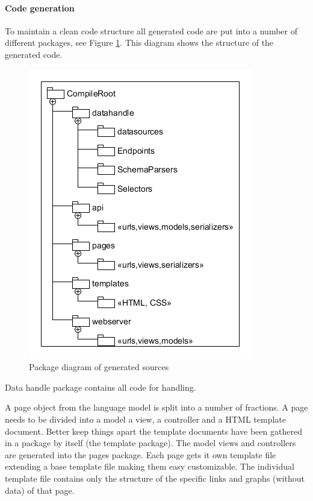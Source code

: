 \paragraph{Code generation}
To maintain a clean code structure all generated code are put into a number of different packages, see Figure \ref{fig:packagediagram}.
This diagram shows the structure of the generated code.
\begin{figure}
\begin{center}
\includegraphics[width=\linewidth]{images/PackageDiagram}
\end{center}
\caption{Package diagram of generated sources}
\label{fig:packagediagram}
\end{figure}
Data handle package contains all code for handling.

A page object from the language model is split into a number of fractions.
A page needs to be divided into a model a view, a controller and a HTML template document.
Better keep things apart the template documents have been gathered in a package by itself (the template package).
The model views and controllers are generated into the pages package.
Each page gets it own template file extending a base template file making them easy customizable.
The individual template file contains only the structure of the specific links and graphs (without data) of that page.

